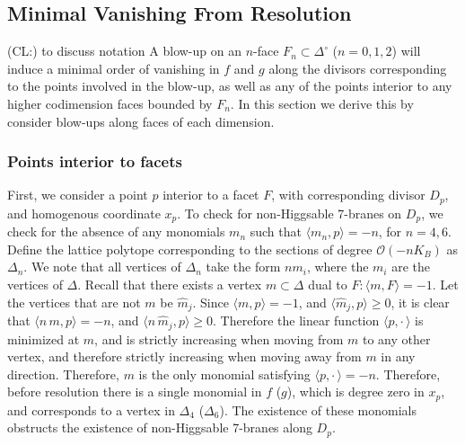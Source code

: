 \documentclass[aps,prl,twocolumn, superscriptaddress,groupedaddress,nofootinbib]{revtex4}
\newcommand{\cl}[1]{{\color{red}(CL:) #1}}
\begin{document}
\subsection{Minimal Vanishing From Resolution}
\cl{to discuss notation}
A blow-up on an $n$-face $F_n \subset \Delta^\circ$ ($n = 0, 1, 2$) will induce a minimal order of vanishing in $f$ and $g$ along the divisors corresponding to the points involved in the blow-up, as well as any of the points interior to any higher codimension faces bounded by $F_n$. In this section we derive this by consider blow-ups along faces of each dimension.
\subsubsection{Points interior to facets}
First, we consider a point $p$ interior to a facet $F$, with corresponding divisor $D_p$, and homogenous coordinate $x_p$. To check for non-Higgsable 7-branes on $D_p$, we check for the absence of any monomials $m_n$ such that $\langle m_n, p \rangle = -n$, for $n = 4,6$. Define the lattice polytope corresponding to the sections of degree $\mathcal{O}(-n K_B)$ as $\Delta_n$. We note that all vertices of $\Delta_n$ take the form $nm_i$, where the $m_i$ are the vertices of $\Delta$. Recall that there exists a vertex $m\subset \Delta$ dual to $F: \langle m, F \rangle = -1$. Let the vertices that are not $m$ be $\hat{m}_j$. Since $\langle m, p \rangle = -1$, and $\langle \hat{m}_j, p \rangle \geq 0$, it is clear that $\langle n\,m, p \rangle = -n$, and $\langle n\,\hat{m}_j, p \rangle \geq 0$. Therefore the linear function $\langle p, \cdot \, \rangle$ is minimized at $m$, and is strictly increasing when moving from $m$ to any other vertex, and therefore strictly increasing when moving away from $m$ in any direction. Therefore, $m$ is the only monomial satisfying $\langle p, \cdot\, \rangle = -n$. Therefore, before resolution there is a single monomial in $f$ ($g$), which is degree zero in $x_p$, and corresponds to a vertex in $\Delta_4$ ($\Delta_6$). The existence of these monomials obstructs the existence of non-Higgsable 7-branes along $D_p$.
\end{document}
